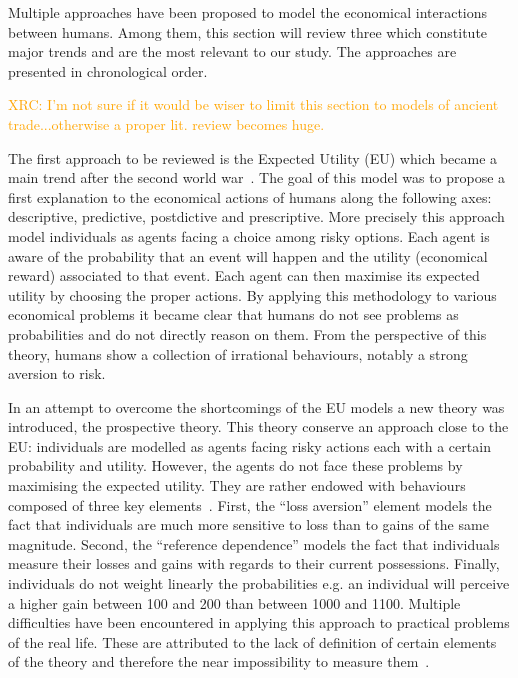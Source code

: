 \documentclass{wscpaperproc}
\newcommand{\memo}[2]{\textcolor{#1}{#2}}
\newcommand{\xrc}[1]{\memo{orange}{XRC: #1\\}}
\begin{document}
Multiple approaches have been proposed to model the economical interactions between humans. Among them, this section will review three which constitute major trends and are the most relevant to our study. The approaches are presented in chronological order.

\xrc{I'm not sure if it would be wiser to limit this section to models of ancient trade...otherwise a proper lit. review becomes huge.}

The first approach to be reviewed is the Expected Utility (EU) which became a main trend after the second world war~\cite{schoemaker_expected_1982}. The goal of this model was to propose a first explanation to the economical actions of humans along the following axes: descriptive, predictive, postdictive and prescriptive. More precisely this approach model individuals as agents facing a choice among risky options. Each agent is aware of the probability that an event will happen and the utility (economical reward) associated to that event. Each agent can then maximise its expected utility by choosing the proper actions. By applying this methodology to various economical problems it became clear that humans do not see problems as probabilities and do not directly reason on them. From the perspective of this theory, humans show a collection of irrational behaviours, notably a strong aversion to risk.

In an attempt to overcome the shortcomings of the EU models a new theory was introduced, the prospective theory. This theory conserve an approach close to the EU: individuals are modelled as agents facing risky actions each with a certain probability and utility. However, the agents do not face these problems by maximising the expected utility. They are rather endowed with behaviours composed of three key elements~\cite{camerer_prospect_2004}. First, the ``loss aversion'' element models the fact that individuals are much more sensitive to loss than to gains of the same magnitude. Second, the ``reference dependence'' models the fact that individuals measure their losses and gains with regards to their current possessions. Finally, individuals do not weight linearly the probabilities e.g. an individual will perceive a higher gain between 100 and 200 than between 1000 and 1100. Multiple difficulties have been encountered in applying this approach to practical problems of the real life. These are attributed to the lack of definition of certain elements of the theory and therefore the near impossibility to measure them~\cite{barberis_thirty_2012}.
\end{document}
